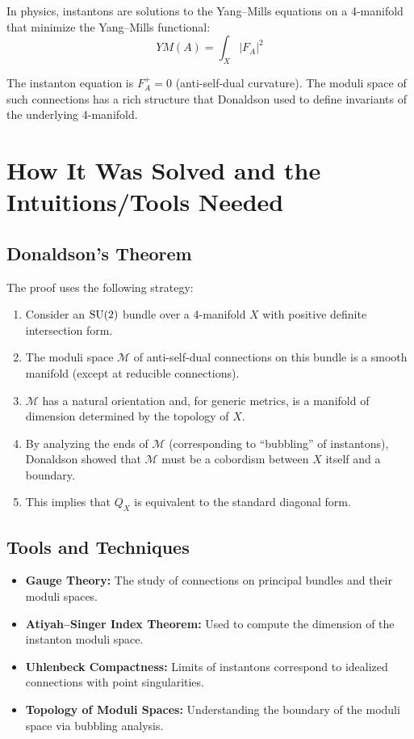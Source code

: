 In physics, instantons are solutions to the Yang--Mills equations on a 4-manifold that minimize the Yang--Mills functional:
\[
YM(A) = \int_X |F_A|^2
\]

The instanton equation is $F_A^+ = 0$ (anti-self-dual curvature). The moduli space of such connections has a rich structure that Donaldson used to define invariants of the underlying 4-manifold.

\section{How It Was Solved and the Intuitions/Tools Needed}

\subsection{Donaldson's Theorem}

The proof uses the following strategy:
\begin{enumerate}
    \item Consider an $\operatorname{SU}(2)$ bundle over a 4-manifold $X$ with positive definite intersection form.
    \item The moduli space $\mathcal{M}$ of anti-self-dual connections on this bundle is a smooth manifold (except at reducible connections).
    \item $\mathcal{M}$ has a natural orientation and, for generic metrics, is a manifold of dimension determined by the topology of $X$.
    \item By analyzing the ends of $\mathcal{M}$ (corresponding to ``bubbling'' of instantons), Donaldson showed that $\mathcal{M}$ must be a cobordism between $X$ itself and a boundary.
    \item This implies that $Q_X$ is equivalent to the standard diagonal form.
\end{enumerate}

\subsection{Tools and Techniques}

\begin{itemize}
    \item \textbf{Gauge Theory:} The study of connections on principal bundles and their moduli spaces.
    \item \textbf{Atiyah--Singer Index Theorem:} Used to compute the dimension of the instanton moduli space.
    \item \textbf{Uhlenbeck Compactness:} Limits of instantons correspond to idealized connections with point singularities.
    \item \textbf{Topology of Moduli Spaces:} Understanding the boundary of the moduli space via bubbling analysis.
\end{itemize}

